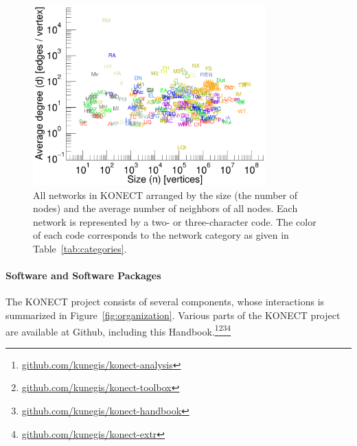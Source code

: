 \documentclass{article}
\begin{document}
\begin{figure}
  \centering
  \includegraphics[width=0.8\textwidth]{plot/scatter.c.size.avgdegree.28}
  \caption[*]{
    All networks in KONECT
    arranged by the size (the number of nodes) and the
    average number of neighbors of all nodes.  Each network is
    represented by a two- or three-character code. The color of each
    code corresponds to the network 
    category as given in Table~\ref{tab:categories}.  
  }
  \label{fig:scatter.size.avgdegree}
\end{figure}

\paragraph{Software and Software Packages}
The KONECT project consists of several components, whose interactions is
summarized in Figure~\ref{fig:organization}.  Various parts of the
KONECT project are available at Github, including this Handbook.\footnote{\href{https://github.com/kunegis/konect-analysis}{github.com/kunegis/konect-analysis}}\footnote{\href{https://github.com/kunegis/konect-toolbox}{github.com/kunegis/konect-toolbox}}\footnote{\href{https://github.com/kunegis/konect-handbook}{github.com/kunegis/konect-handbook}}\footnote{\href{https://github.com/kunegis/konect-extr}{github.com/kunegis/konect-extr}}
\end{document}

